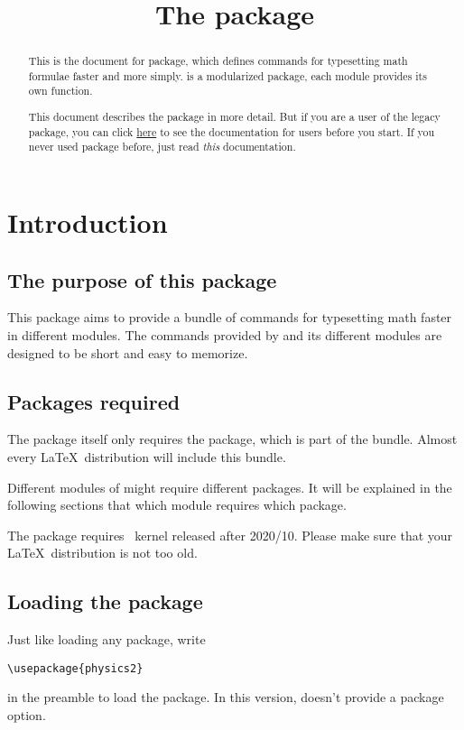 \documentclass[11pt,letterpaper]{article}
\title{The \pkg{physics2} package}
\begin{document}
\maketitle

\begin{abstract}
This is the document for  package, which defines commands for
typesetting math formulae faster and more simply.  is a
modularized package, each module provides its own function. 

This document describes the  package in more detail.
But if you are a user of the legacy  package, you can click
\href{./physics2-legacy.pdf}{here} to see the documentation for
 users before you start. If you never used  package
before, just read \emph{this} documentation.
\end{abstract}

\tableofcontents

\section{Introduction}
\subsection{The purpose of this package}
This package aims to provide a bundle of commands for typesetting math faster
in different modules. The commands provided by  and its different
modules are designed to be short and easy to memorize.

\subsection{Packages required}
The  package itself only requires the  package, which
is part of the  bundle. Almost every \LaTeX\ distribution
will include this bundle.

Different modules of  might require different packages. It will
be explained in the following sections that which module requires which package.

The  package requires \LaTeXe\ kernel released after 2020/10.
Please make sure that your \LaTeX\ distribution is not too old.

\subsection{Loading the  package}
Just like loading any package, write
\begin{Verbatim}
\usepackage{physics2}
\end{Verbatim}
in the preamble to load the  package. In this version,
 doesn't provide a package option.
\end{document}

